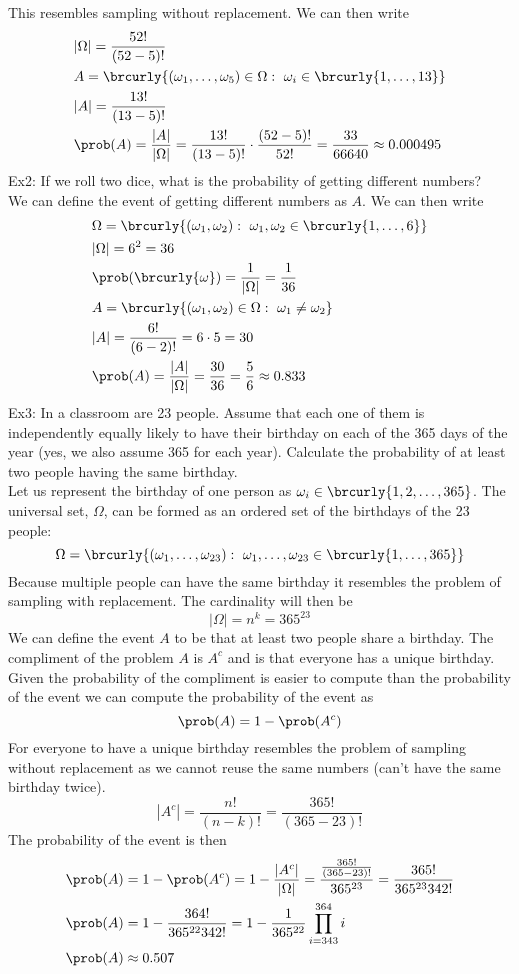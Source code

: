 This resembles sampling without replacement. We can then write
\begin{align*}
    &|\Omega|=\frac{52!}{(52-5)!}\\
    &A=\brcurly{(\omega_1,\ldots,\omega_5)\in\Omega:\ \omega_i\in\brcurly{1,\ldots,13}}\\
    &|A|=\frac{13!}{(13-5)!}\\
    &\prob(A)=\frac{|A|}{|\Omega|}=\frac{13!}{(13-5)!}\cdot\frac{(52-5)!}{52!}=\frac{33}{66640}\approx0.000495
\end{align*}
Ex2: If we roll two dice, what is the probability of getting different numbers?\\
We can define the event of getting different numbers as $A$. We can then write
\begin{align*}
    &\Omega=\brcurly{(\omega_1,\omega_2):\ \omega_1,\omega_2\in\brcurly{1,\ldots,6}}\\
    &|\Omega|=6^2=36\\
    &\prob(\brcurly{\omega})=\frac{1}{|\Omega|}=\frac{1}{36}\\
    &A=\brcurly{(\omega_1,\omega_2)\in\Omega:\ \omega_1\neq\omega_2}\\
    &|A|=\frac{6!}{(6-2)!}=6\cdot 5=30\\
    &\prob(A)=\frac{|A|}{|\Omega|}=\frac{30}{36}=\frac{5}{6}\approx0.833
\end{align*}
Ex3: In a classroom are 23 people. Assume that each one of them is independently equally likely to have their birthday on each of the 365 days of the year (yes, we also assume 365 for each year). Calculate the probability of at least two people having the same birthday.\\

Let us represent the birthday of one person as $\omega_i\in\brcurly{1,2,\ldots,365}$.
The universal set, $\Omega$, can be formed as an ordered set of the birthdays of the 23 people:
\[
\Omega = \brcurly{(\omega_1,\ldots,\omega_{23}):\ \omega_1,\ldots,\omega_{23}\in\brcurly{1,\ldots,365}}
\]
Because multiple people can have the same birthday it resembles the problem of sampling with replacement. The cardinality will then be
\[
|\Omega|=n^k=365^{23}
\]
We can define the event $A$ to be that at least two people share a birthday.
The compliment of the problem $A$ is $A^c$ and is that everyone has a unique birthday. Given the probability of the compliment is easier to compute than the probability of the event we can compute the probability of the event as
\[
\prob(A)=1-\prob(A^c)
\]
For everyone to have a unique birthday resembles the problem of sampling without replacement as we cannot reuse the same numbers (can't have the same birthday twice).
\[
|A^c|=\frac{n!}{(n-k)!}=\frac{365!}{(365-23)!}
\]
The probability of the event is then
\begin{align*}
    &\prob(A)=1-\prob(A^c)=1-\frac{|A^c|}{|\Omega|}=\frac{\frac{365!}{(365-23)!}}{365^{23}}=\frac{365!}{365^{23}342!}\\
    &\prob(A)=1-\frac{364!}{365^{22}342!}=1-\frac{1}{365^{22}}\prod_{i=343}^{364}i\\
    &\prob(A)\approx 0.507
\end{align*}


